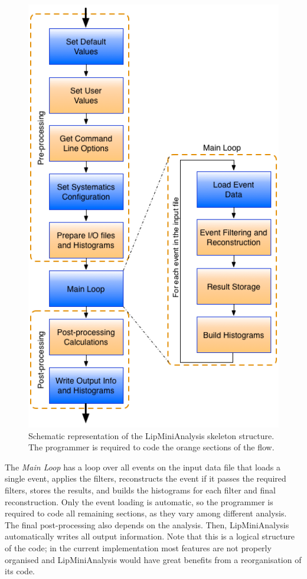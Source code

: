 \begin{figure}[!htp]
	\begin{center}
		\includegraphics[scale=0.7]{imgs/lipminianalysis.png}
		\caption{Schematic representation of the LipMiniAnalysis skeleton structure. The programmer is required to code the orange sections of the flow.}
		\label{fig:lipmini}
	\end{center}
\end{figure}

The \textit{Main Loop} has a loop over all events on the input data file that loads a single event, applies the filters, reconstructs the event if it passes the required filters, stores the results, and builds the histograms for each filter and final reconstruction. Only the event loading is automatic, so the programmer is required to code all remaining sections, as they vary among different analysis. The final post-processing also depends on the analysis. Then, LipMiniAnalysis automatically writes all output information. Note that this is a logical structure of the code; in the current implementation most features are not properly organised and LipMiniAnalysis would have great benefits from a reorganisation of its code.

